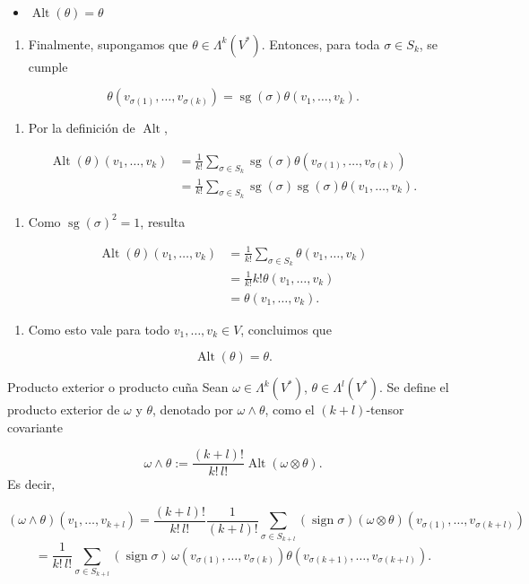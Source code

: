 \begin{bookproof}{}
\begin{itemize}
\item $\operatorname{Alt}(\theta)=\theta$
\end{itemize}
\begin{enumerate}
\item Finalmente, supongamos que $\theta\in\Lambda^k(V^*)$. Entonces, para toda $\sigma\in S_k$, se cumple
\end{enumerate}
\[
\theta(v_{\sigma(1)},\dots,v_{\sigma(k)})=\operatorname{sg}(\sigma)\theta(v_1,\dots,v_k).
\]
\begin{enumerate}[start=2]
\item Por la definición de $\operatorname{Alt}$,
\end{enumerate}
\[
\begin{aligned}\operatorname{Alt}(\theta)(v_1,\dots,v_k)&=\frac{1}{k!}\sum_{\sigma\in S_k}\operatorname{sg}(\sigma)\theta(v_{\sigma(1)},\dots,v_{\sigma(k)})\\&=\frac{1}{k!}\sum_{\sigma\in S_k}\operatorname{sg}(\sigma)\operatorname{sg}(\sigma)\theta(v_1,\dots,v_k).\end{aligned}
\]
\begin{enumerate}[start=3]
\item Como $\operatorname{sg}(\sigma)^2=1$, resulta
\end{enumerate}
\[
\begin{aligned}\operatorname{Alt}(\theta)(v_1,\dots,v_k)&=\frac{1}{k!}\sum_{\sigma\in S_k}\theta(v_1,\dots,v_k)\\&=\frac{1}{k!}k!\theta(v_1,\dots,v_k)\\&=\theta(v_1,\dots,v_k).\end{aligned}
\]
\begin{enumerate}[start=4]
\item Como esto vale para todo $v_1,\dots,v_k\in V$, concluimos que
\end{enumerate}
\[
\operatorname{Alt}(\theta)=\theta.
\]
\bookqed
\end{bookproof}
\label{blk:c407fe}
\begin{bookdefinition}{Producto exterior o producto cuña}
Sean $\omega\in\Lambda^k(V^*)$, $\theta\in\Lambda^l(V^*)$. Se define el producto exterior de $\omega$ y $\theta$, denotado por $\omega\wedge\theta$, como el $(k+l)$-tensor covariante

\[
\omega\wedge\theta:=\frac{(k+l)!}{k!\,l!}\operatorname{Alt}(\omega\otimes\theta).
\]
Es decir,

\[
(\omega\wedge\theta)(v_1,\ldots,v_{k+l})= \frac{(k+l)!}{k!\,l!}\frac1{(k+l)!}\sum_{\sigma\in S_{k+l}}(\operatorname{sign}\sigma)(\omega\otimes\theta)(v_{\sigma(1)},\ldots,v_{\sigma(k+l)})
\]
\[
= \frac1{k!\,l!}\sum_{\sigma\in S_{k+l}}(\operatorname{sign}\sigma)\, \omega(v_{\sigma(1)},\ldots,v_{\sigma(k)})\theta(v_{\sigma(k+1)},\ldots,v_{\sigma(k+l)}).
\]
\end{bookdefinition}
